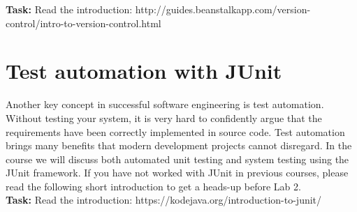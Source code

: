 \documentclass{scrreprt}
\begin{document}
\textbf{Task:} Read the introduction: http://guides.beanstalkapp.com/version-control/intro-to-version-control.html

\chapter{Test automation with JUnit}
Another key concept in successful software engineering is test automation. Without testing your system, it is very hard to confidently argue that the requirements have been correctly implemented in source code. Test automation brings many benefits that modern development projects cannot disregard. In the course we will discuss both automated unit testing and system testing using the JUnit framework. If you have not worked with JUnit in previous courses, please read the following short introduction to get a heads-up before Lab 2.\\

\textbf{Task:} Read the introduction: https://kodejava.org/introduction-to-junit/
\end{document}

